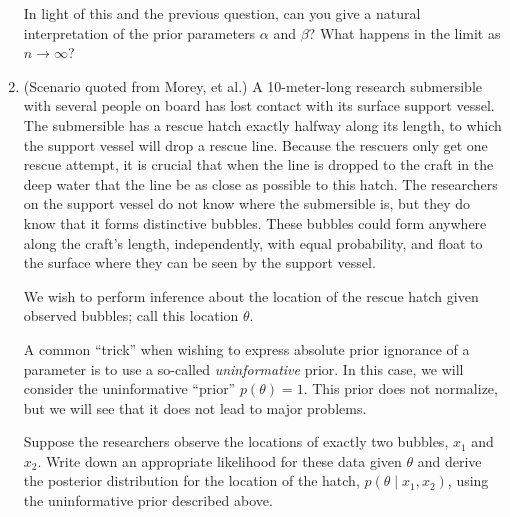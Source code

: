 \documentclass{article}
\newcommand{\given}{\mid}
\begin{document}
\begin{enumerate}
  In light of this and the previous question, can you give a natural
  interpretation of the prior parameters $\alpha$ and $\beta$?
  What happens in the limit as $n \to \infty$?

\item
  (Scenario quoted from Morey, et al.)  A 10-meter-long research
  submersible with several people on board has lost contact with its
  surface support vessel. The submersible has a rescue hatch exactly
  halfway along its length, to which the support vessel will drop a
  rescue line. Because the rescuers only get one rescue attempt, it is
  crucial that when the line is dropped to the craft in the deep water
  that the line be as close as possible to this hatch. The researchers
  on the support vessel do not know where the submersible is, but they
  do know that it forms distinctive bubbles. These bubbles could form
  anywhere along the craft's length, independently, with equal
  probability, and float to the surface where they can be seen by the
  support vessel.

  We wish to perform inference about the location of the rescue
  hatch given observed bubbles; call this location $\theta$.

  A common ``trick'' when wishing to express absolute prior ignorance
  of a parameter is to use a so-called \emph{uninformative} prior. In
  this case, we will consider the uninformative ``prior'' $p(\theta) =
  1$. This prior does not normalize, but we will see that it does not
  lead to major problems.

  Suppose the researchers observe the locations of exactly two
  bubbles, $x_1$ and $x_2$. Write down an appropriate likelihood for
  these data given $\theta$ and derive the posterior distribution for
  the location of the hatch, $p(\theta \given x_1, x_2)$, using the
  uninformative prior described above.

\end{enumerate}
\end{document}
